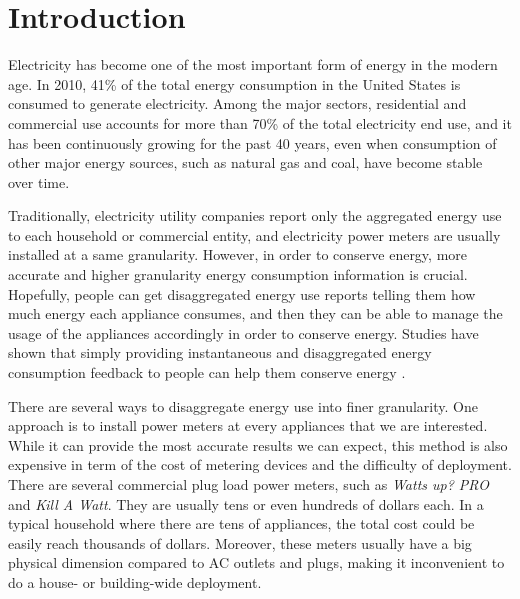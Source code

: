 \chapter{Introduction}\label{chap1}

Electricity has become one of the most important form of energy in the modern age. In 2010, 41\% of the total energy consumption in the United States is consumed to generate electricity. Among the major sectors, residential and commercial use accounts for more than 70\% of the total electricity end use, and it has been continuously growing for the past 40 years, even when consumption of other major energy sources, such as natural gas and coal, have become stable over time. \cite{U.S.EnergyInformationAdministration2011}

Traditionally, electricity utility companies report only the aggregated energy use to each household or commercial entity, and electricity power meters are usually installed at a same granularity. However, in order to conserve energy, more accurate and higher granularity energy consumption information is crucial. Hopefully, people can get disaggregated energy use reports telling them how much energy each appliance consumes, and then they can be able to manage the usage of the appliances accordingly in order to conserve energy. Studies have shown that simply providing instantaneous and disaggregated energy consumption feedback to people can help them conserve energy \cite{Darby2006,Parker2006,Fischer2008}.


There are several ways to disaggregate energy use into finer granularity. One approach is to install power meters at every appliances that we are interested. While it can provide the most accurate results we can expect, this method is also expensive in term of the cost of metering devices and the difficulty of deployment. There are several commercial plug load power meters, such as \textit{Watts up? PRO} and \textit{Kill A Watt}. They are usually tens or even hundreds of dollars each. In a typical household where there are tens of appliances, the total cost could be easily reach thousands of dollars. Moreover, these meters usually have a big physical dimension compared to AC outlets and plugs, making it inconvenient to do a house- or building-wide deployment. 

